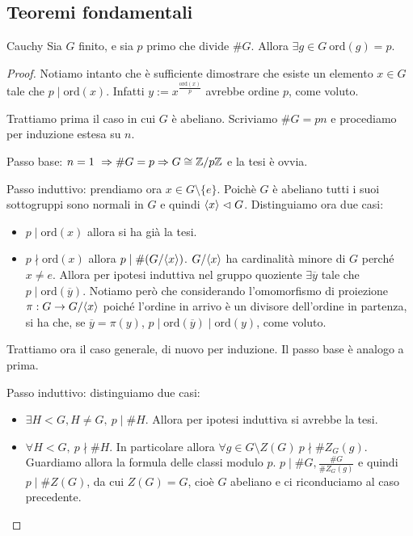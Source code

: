 \subsection{Teoremi fondamentali}
\begin{theorem}{Cauchy}
    Sia $G$ finito, e sia $p$ primo che divide $\#G$. Allora $\exists g\in G \ \text{ord}(g) = p$.
\end{theorem}
\begin{proof}
    Notiamo intanto che è sufficiente dimostrare che esiste un elemento $x \in G$ tale che $p \mid \text{ord}(x)$. Infatti $y := x^{\frac{\text{ord}(x)}{p}}$ avrebbe ordine $p$, come voluto.
    
    Trattiamo prima il caso in cui $G$ è abeliano. Scriviamo $\#G = pn$ e procediamo per induzione estesa su $n$.
    
    Passo base: $n = 1 \ \Rightarrow \#G = p \Rightarrow G \cong \mathbb{Z}/p\mathbb{Z}$ e la tesi è ovvia.
    
    Passo induttivo: prendiamo ora $x \in G \setminus \{e\}$. Poichè $G$ è abeliano tutti i suoi sottogruppi sono normali in $G$ e quindi $\langle x \rangle \vartriangleleft G$. Distinguiamo ora due casi: 
    \begin{itemize}
        \item $p \mid \text{ord}(x)$ allora si ha già la tesi.
        \item $p \nmid \text{ord}(x)$ allora $p \mid \#(G/\langle x \rangle)$. $G/\langle x \rangle$ ha cardinalità minore di $G$ perché $x \neq e$. Allora per ipotesi induttiva nel gruppo quoziente $\exists \overline y$ tale che $p \mid \text{ord}(\overline y)$. Notiamo però che considerando l'omomorfismo di proiezione $\pi : G \rightarrow G/\langle x \rangle$ poiché l'ordine in arrivo è un divisore dell'ordine in partenza, si ha che, se $\overline y = \pi(y)$, $p \mid \text{ord}(\overline y) \mid \text{ord}(y)$, come voluto.
    \end{itemize}
    Trattiamo ora il caso generale, di nuovo per induzione. Il passo base è analogo a prima.
    
    Passo induttivo: distinguiamo due casi:
    \begin{itemize}
        \item $\exists H < G, H \neq G, \ p \mid \#H$. Allora per ipotesi induttiva si avrebbe la tesi. 
        \item $\forall H < G, \ p \nmid \#H$. In particolare allora $\forall g \in G \setminus Z(G) \ p \nmid \#Z_G(g)$. Guardiamo allora la formula delle classi modulo $p$. $p \mid \#G, \frac{\#G}{\#Z_G(g)}$ e quindi $p \mid \#Z(G)$, da cui $Z(G) = G$, cioè $G$ abeliano e ci riconduciamo al caso precedente.
    \end{itemize}


\end{proof}
